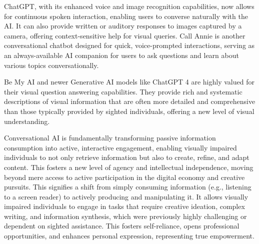 ChatGPT, with its enhanced voice and image recognition capabilities, now allows for continuous spoken interaction, enabling users to converse naturally with the AI. It can also provide written or auditory responses to images captured by a camera, offering context-sensitive help for visual queries. \cite{accessiblepharmacy2024} Call Annie is another conversational chatbot designed for quick, voice-prompted interactions, serving as an always-available AI companion for users to ask questions and learn about various topics conversationally. \cite{accessiblepharmacy2024}

Be My AI and newer Generative AI models like ChatGPT 4 are highly valued for their visual question answering capabilities. They provide rich and systematic descriptions of visual information that are often more detailed and comprehensive than those typically provided by sighted individuals, offering a new level of visual understanding. \cite{maitraye2024}

Conversational AI is fundamentally transforming passive information consumption into active, interactive engagement, enabling visually impaired individuals to not only retrieve information but also to create, refine, and adapt content. This fosters a new level of agency and intellectual independence, moving beyond mere access to active participation in the digital economy and creative pursuits. This signifies a shift from simply consuming information (e.g., listening to a screen reader) to actively producing and manipulating it. It allows visually impaired individuals to engage in tasks that require creative ideation, complex writing, and information synthesis, which were previously highly challenging or dependent on sighted assistance. This fosters self-reliance, opens professional opportunities, and enhances personal expression, representing true empowerment.

